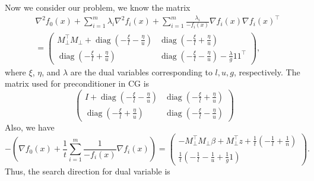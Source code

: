 \documentclass{article}
\begin{document}
Now we consider our problem, we know the matrix
\begin{equation}
    \begin{aligned}
        &\nabla^2 f_0(x)+\sum_{i=1}^m \lambda_i \nabla^2 f_i(x)+\sum_{i=1}^m \frac{\lambda_i}{-f_i(x)} \nabla f_i(x) \nabla f_i(x)^{\top}\\
        &=\left(\begin{array}{ll}
M_{\perp}^{\top} M_{\perp}+\operatorname{diag}\left(-\frac{\xi}{l}-\frac{\eta}{u}\right) & \operatorname{diag}\left(-\frac{\xi}{l}+\frac{\eta}{u}\right) \\
\operatorname{diag}\left(-\frac{\xi}{l}+\frac{\eta}{u}\right) & \operatorname{diag}\left(-\frac{\xi}{l}-\frac{\eta}{u}\right)-\frac{\lambda}{g} 11^{\top}
\end{array}\right),
    \end{aligned}
\end{equation}
where $\xi$, $\eta$, and $\lambda$
 are the dual variables corresponding to $l, u, g$, respectively. The matrix used for preconditioner in CG is
 \begin{equation}
     \left(\begin{array}{ll}
I+\operatorname{diag}\left(-\frac{\xi}{l}-\frac{\eta}{u}\right) & \operatorname{diag}\left(-\frac{\xi}{l}+\frac{\eta}{u}\right) \\
\operatorname{diag}\left(-\frac{\xi}{l}+\frac{\eta}{u}\right) & \operatorname{diag}\left(-\frac{\xi}{l}-\frac{\eta}{u}\right)
\end{array}\right)
 \end{equation}
 Also, we have
 \begin{equation}
     -\left(\nabla f_0(x)+\frac{1}{t} \sum_{i=1}^m \frac{1}{-f_i(x)} \nabla f_i(x)\right)=\left(\begin{array}{c}
-M_{\perp}^{\top} M_{\perp} \beta+M_{\perp}^{\top} z+\frac{1}{t}\left(-\frac{1}{l}+\frac{1}{n}\right) \\
\frac{1}{t}\left(-\frac{1}{l}-\frac{1}{u}+\frac{1}{g} 1\right)
\end{array}\right).
 \end{equation}
 Thus, the search direction for dual variable is
\end{document}
